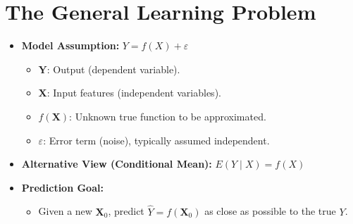\documentclass[10pt]{article}
\begin{document}
\section{The General Learning Problem}
\begin{itemize}
    \item \textbf{Model Assumption:} \(Y = f(X) + \varepsilon\)
    \begin{itemize}
        \item \(\mathbf{Y}\): Output (dependent variable).
        \item \(\mathbf{X}\): Input features (independent variables).
        \item \(f(\mathbf{X})\): Unknown true function to be approximated.
        \item \(\varepsilon\): Error term (noise), typically assumed independent.
    \end{itemize}
    \item \textbf{Alternative View (Conditional Mean):} \(E(Y \mid X) = f(X)\)
    \item \textbf{Prediction Goal:}
    \begin{itemize}
        \item Given a new \(\mathbf{X}_0\), predict \(\hat{Y} = f(\mathbf{X}_0)\) as close as possible to the true \(Y\).
    \end{itemize}
\end{itemize}
\end{document}
